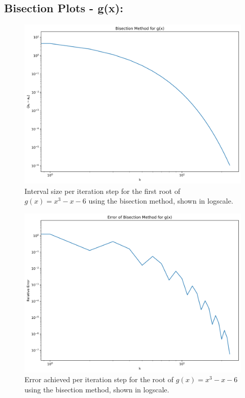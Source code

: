 \documentclass[11pt]{article}
\begin{document}

\subsection{Bisection Plots - g(x):}
\begin{figure}[H]
	\centering
	\includegraphics[width=\linewidth]{../figures/Bisection_g}
	\caption{Interval size per iteration step for the first root of $g(x) = x^3 - x - 6$ using the bisection method, shown in logscale.}
	\label{fig:bisec_g}
\end{figure}

\begin{figure}[H]
	\centering
	\includegraphics[width=\linewidth]{../figures/Bisection_g_err}
	\caption{Error achieved per iteration step for the root of $g(x) = x^3 - x - 6$ using the bisection method, shown in logscale.}
	\label{fig:bisec_g_err}
\end{figure}
\end{document}

